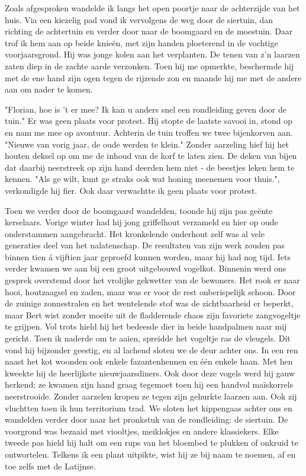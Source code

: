 \documentclass[12pt, justified, a4paper, symmetric]{tufte-book}
\begin{document}
Zoals afgesproken wandelde ik langs het open poortje naar de achterzijde van het huis. Via een kiezelig pad vond ik vervolgens de weg door de siertuin, dan richting de achtertuin en verder door naar de boomgaard en de moestuin. Daar trof ik hem aan op beide knie\"en, met zijn handen ploeterend in de vochtige voorjaarsgrond. Hij was jonge kolen aan het verplanten. De tenen van z'n laarzen zaten diep in de zachte aarde verzonken. Toen hij me opmerkte, beschermde hij met de ene hand zijn ogen tegen de rijzende zon en maande hij me met de andere aan om nader te komen.

"Florian, hoe is 't er mee? Ik kan u anders snel een rondleiding geven door de tuin." Er was geen plaats voor protest. Hij stopte de laatste savooi in, stond op en nam me mee op avontuur. Achterin de tuin troffen we twee bijenkorven aan. "Nieuwe van vorig jaar, de oude werden te klein." Zonder aarzeling hief hij het houten deksel op om me de inhoud van de korf te laten zien. De deken van bijen dat daarbij neerstreek op zijn hand deerden hem niet - de beestjes leken hem te kennen. "Als ge wilt, kunt ge straks ook wat honing meenemen voor thuis.", verkondigde hij fier. Ook daar verwachtte ik geen plaats voor protest.

Toen we verder door de boomgaard wandelden, toonde hij zijn pas ge\"ente kerselaars. Vorige winter had hij jong griffelhout verzameld en hier op oude onderstammen aangebracht. Het kronkelende onderhout zelf was al vele generaties deel van het nalatenschap. De resultaten van zijn werk zouden pas binnen tien \'a vijftien jaar geproefd kunnen worden, maar hij had nog tijd. Iets verder kwamen we aan bij een groot uitgebouwd vogelkot. Binnenin werd ons gesprek overstemd door het vrolijke gekwetter van de bewoners. Het rook er naar hooi, houtzaagsel en zaden, maar was er voor de rest onberispelijk schoon. Door de zuinige zonnestralen en het wentelende stof was de zichtbaarheid er beperkt, maar Bert wist zonder moeite uit de fladderende chaos zijn favoriete zangvogeltje te grijpen. Vol trots hield hij het bedeesde dier in beide handpalmen naar mij gericht. Toen ik naderde om te aaien, spreidde het vogeltje ras de vleugels. Dit vond hij bijzonder geestig, en al lachend sloten we de deur achter ons. In een ren naast het kot woonden ook enkele fazantenhennen en \'e\'en enkele haan. Met hen kweekte hij de heerlijkste nieuwjaarsdiners. Ook door deze vogels werd hij gauw herkend; ze kwamen zijn hand graag tegemoet toen hij een handvol ma\"iskorrels neerstrooide. Zonder aarzelen kropen ze tegen zijn gehurkte laarzen aan. Ook zij vluchtten toen ik hun territorium trad. We sloten het kippengaas achter ons en wandelden verder door naar het pronkstuk van de rondleiding: de siertuin. De voorgrond was bezaaid met viooltjes, meiklokjes en andere klassiekers. Elke tweede pas hield hij halt om een rups van het bloembed te plukken of onkruid te ontwortelen. Telkens ik een plant uitpikte, wist hij ze bij naam te noemen, af en toe zelfs met de Latijnse.
\end{document}
